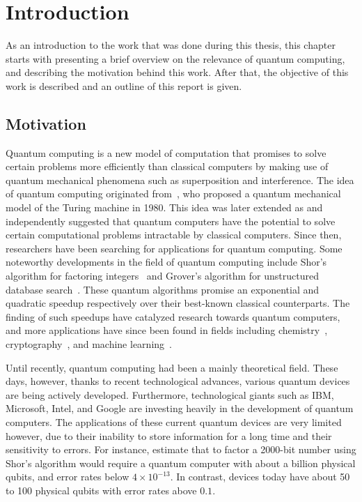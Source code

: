 \chapter{Introduction}
As an introduction to the work that was done during this thesis, this chapter starts with presenting a brief overview on the relevance of quantum computing, and describing the motivation behind this work.
After that, the objective of this work is described and an outline of this report is given.

\section{Motivation}
Quantum computing is a new model of computation that promises to solve certain problems more efficiently than classical computers by making use of quantum mechanical phenomena such as superposition and interference.
The idea of quantum computing originated from~\textcite{benioff1980computer}, who proposed a quantum mechanical model of the Turing machine in 1980.
This idea was later extended as \textcite{manin1980vychislimoe} and \textcite{feynman1982simulating} independently suggested that quantum computers have the potential to solve certain computational problems intractable by classical computers.
Since then, researchers have been searching for applications for quantum computing.
Some noteworthy developments in the field of quantum computing include Shor's algorithm for factoring integers~\cite{shor1999polynomial} and Grover's algorithm for unstructured database search~\cite{grover1996fast}.
These quantum algorithms promise an exponential and quadratic speedup respectively over their best-known classical counterparts.
The finding of such speedups have catalyzed research towards quantum computers, and more applications have since been found in fields including chemistry~\cite{mcardle2018quantum}, cryptography~\cite{bennett2014quantum}, and machine learning~\cite{biamonte2017quantum}.

Until recently, quantum computing had been a mainly theoretical field.
These days, however, thanks to recent technological advances, various quantum devices are being actively developed.
Furthermore, technological giants such as IBM, Microsoft, Intel, and Google are investing heavily in the development of quantum computers.
The applications of these current quantum devices are very limited however, due to their inability to store information for a long time and their sensitivity to errors.
For instance, \textcite[Appendix~M]{fowler2012surface} estimate that to factor a 2000-bit number using Shor's algorithm would require a quantum computer with about a billion physical qubits, and error rates below $4 \times 10^{-13}$.
In contrast, devices today have about 50 to 100 physical qubits with error rates above $0.1$.

